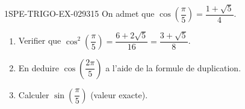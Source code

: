 \begin{exercice}{1SPE-TRIGO-EX-029}{3}{15}
On admet que $\cos\!\left(\dfrac{\pi}{5}\right) = \dfrac{1+\sqrt{5}}{4}$.
\begin{enumerate}
  \item Verifier que $\cos^2\!\left(\dfrac{\pi}{5}\right) = \dfrac{6+2\sqrt{5}}{16} = \dfrac{3+\sqrt{5}}{8}$.
  \item En deduire $\cos\!\left(\dfrac{2\pi}{5}\right)$ a l'aide de la formule de duplication.
  \item Calculer $\sin\!\left(\dfrac{\pi}{5}\right)$ (valeur exacte).
\end{enumerate}
\end{exercice}
